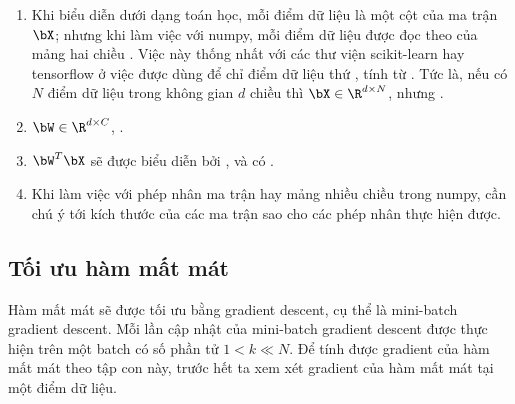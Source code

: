 \begin{mydeff}
\begin{enumerate}
    \item Khi biểu diễn dưới dạng toán học, mỗi điểm dữ liệu là một cột của ma trận
    $\bX$; nhưng khi làm việc với numpy, mỗi điểm dữ liệu được đọc theo
     của mảng hai chiều .
    Việc này
    thống nhất với các thư viện scikit-learn hay tensorflow ở việc
     được dùng để chỉ điểm dữ liệu thứ , tính
    từ . Tức là, nếu có $N$ điểm dữ liệu trong không gian $d$
    chiều thì $\bX \in \R^{d \times N}$, nhưng .

    \item $\bW \in \R^{d\times C}$, . 

    \item $\bW^T\bX$ sẽ được biểu diễn bởi , và có
    . 

    \item Khi làm việc với phép nhân ma trận hay mảng nhiều chiều trong numpy,
    cần chú ý tới kích thước của các ma trận sao cho các phép nhân thực
    hiện được.

\end{enumerate}

\end{mydeff}


\subsection{Tối ưu hàm mất mát }
 

Hàm mất mát sẽ được tối ưu bằng gradient descent, cụ thể là mini-batch
gradient descent. 
Mỗi lần cập nhật của mini-batch gradient descent được thực hiện trên một
{batch} có số phần tử $1 < k \ll N$. Để tính được gradient của hàm mất
mát theo tập con này, trước hết ta xem xét gradient của hàm mất mát tại một điểm
dữ liệu. 

